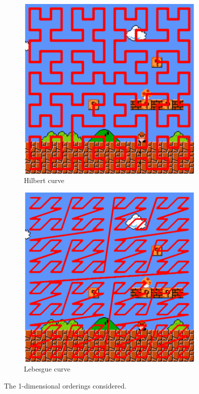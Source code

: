 \documentclass[12pt]{report}
\begin{document}
\begin{figure}[ht]
\begin{subfigure}[t]{0.18\textwidth}
    \label{fig:snaking}
    \end{subfigure}
    \begin{subfigure}[t]{0.18\textwidth}
    \includegraphics[width=1\textwidth]{figures/Hilbert.png}	       \caption{Hilbert curve}
    \label{fig:hilb}
    \end{subfigure}
    \begin{subfigure}[t]{0.18\textwidth} 
    \includegraphics[width=1\textwidth]{figures/Z_Order.png} 	       \caption{Lebesgue curve}
    \label{fig:zorder}
    \end{subfigure}
    \caption{The 1-dimensional orderings considered.}
    \label{fig:orderings}
\end{figure}
\end{document}
